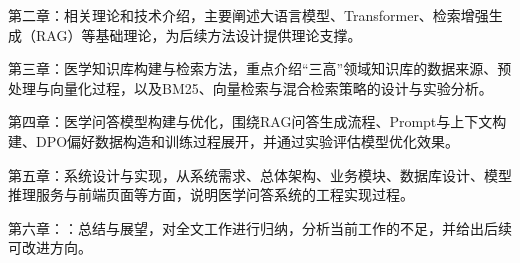 第二章：相关理论和技术介绍，主要阐述大语言模型、Transformer、检索增强生成（RAG）等基础理论，为后续方法设计提供理论支撑。

第三章：医学知识库构建与检索方法，重点介绍“三高”领域知识库的数据来源、预处理与向量化过程，以及BM25、向量检索与混合检索策略的设计与实验分析。

第四章：医学问答模型构建与优化，围绕RAG问答生成流程、Prompt与上下文构建、DPO偏好数据构造和训练过程展开，并通过实验评估模型优化效果。

第五章：系统设计与实现，从系统需求、总体架构、业务模块、数据库设计、模型推理服务与前端页面等方面，说明医学问答系统的工程实现过程。

第六章：：总结与展望，对全文工作进行归纳，分析当前工作的不足，并给出后续可改进方向。
